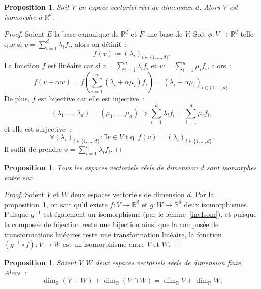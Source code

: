 \documentclass{article}
\DeclareMathOperator{\tq}{\text{ t.q. }}
\newcommand{\R}{\mathbb R}
\newtheorem{prp}[thm]{Proposition}
\theoremstyle{definition}
\theoremstyle{remark}
\begin{document}
		\begin{prp}\label{dimDIsomorpheRd} Soit $V$ un espace vectoriel réel de dimension $d$. Alors $V$ est isomorphe à $\R^d$. \end{prp}

		\begin{proof} Soient $E$ la base canonique de $\R^d$ et $F$ une base de $V$. Soit $\phi : V \to \R^d$ telle que si $v = \sum_{i=1}^d\lambda_if_i$, alors on
		définit~: \[f(v) \coloneqq (\lambda_i)_{i \in \{1, \dotsc, d\}}.\] La fonction $f$ est linéaire car si
		$v = \sum_{i=1}^n\lambda_if_i$ et $w = \sum_{i=1}^n\mu_if_i$, alors~:
		\[f(v + \alpha w) = f\left(\sum_{i=1}^n(\lambda_i + \alpha\mu_i)f_i\right) = (\lambda_i + \alpha\mu_i)_{i \in \{1, \dotsc, d\}}.\]
		De plus, $f$ est bijective car elle est injective~:
		\[(\lambda_1, \dotsc, \lambda_d) = (\mu_1, \dotsc, \mu_d) \Rightarrow \sum_{i=1}^d\lambda_if_i = \sum_{i=1}^d\mu_if_i,\]
		et elle est surjective~:
		\[\forall (\lambda_i)_{i \in \{1, \dotsc, d\}} : \exists v \in V \tq f(v) = (\lambda_i)_{i \in \{1, \dotsc, d\}}.\]
		Il suffit de prendre $v = \sum_{i=1}^n\lambda_if_i$. \end{proof}

		\begin{prp}\label{dimDIso} Tous les espaces vectoriels réels de dimension $d$ sont isomorphes entre eux. \end{prp}

		\begin{proof} Soient $V$ et $W$ deux espaces vectoriels de dimension $d$. Par la proposition~\ref{dimDIsomorpheRd}, on sait qu'il existe $f : V \to \R^d$
		et $g : W \to \R^d$ deux isomorphismes. Puisque $g^{-1}$ est également un isomorphisme (par le lemme~\ref{invIsom}), et puisque la composée de bijection reste
		une bijection ainsi que la composée de transformations linéaires reste une transformation linéaire, la fonction $(g^{-1} \circ f) : V \to W$ est un isomorphisme
		entre $V$ et $W$. \end{proof}

		\begin{prp} Soient $V, W$ deux espaces vectoriels réels de dimension finie. Alors~: \[\dim_\R(V+W) + \dim_\R(V \cap W) = \dim_\R V + \dim_\R W.\] \end{prp}
\end{document}
